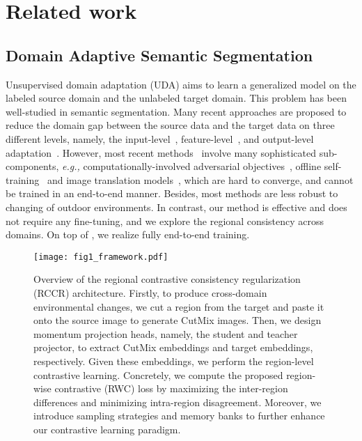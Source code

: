 \documentclass{article}
\begin{document}
  
\section{Related work}


\subsection{Domain Adaptive Semantic Segmentation}

Unsupervised domain adaptation (UDA) aims to learn a generalized model on the labeled source domain and the unlabeled target domain. This problem has been well-studied in semantic segmentation. 
Many recent approaches are proposed to reduce the domain gap between the source data and the target data on three different levels,  namely, the input-level~\cite{BDL,LTIR,LDR}, feature-level~\cite{CBST,CRST}, and output-level adaptation~\cite{AdaptSegNet,SIM,CLANv2}.  
However, most recent methods~\cite{BDL,FDA,SIM,LTIR} involve many sophisticated sub-components, \emph{e.g.,} computationally-involved adversarial objectives~\cite{AdaptSegNet,SIM,CLANv2}, offline self-training~\cite{BDL,DAST,CBST,CRST} and image translation models~\cite{BDL,LTIR,LDR}, which are hard to converge, and cannot be trained in an end-to-end manner. Besides, most methods are  less  robust  to changing of outdoor environments.
In contrast, our method is effective and does not require any fine-tuning, and we explore the regional consistency across domains.  On top of \cite{tranheden2020dacs}, we realize fully end-to-end training.

\begin{figure*}[t]
\centering
\texttt{[image: fig1\_framework.pdf]}
\caption{Overview of the regional contrastive consistency regularization (RCCR) architecture. Firstly, to produce cross-domain environmental changes, we cut a region from the target and paste it onto the source image to generate CutMix images.
Then, we design momentum projection heads, namely, the student and teacher projector, to extract CutMix embeddings and target embeddings, respectively. Given these embeddings, we perform the region-level contrastive learning. Concretely, we compute the proposed region-wise contrastive (RWC) loss  by maximizing  the  inter-region  differences  and  minimizing intra-region disagreement. Moreover, we introduce sampling strategies and memory banks to further enhance our contrastive learning paradigm.
}
\label{fig1}
\end{figure*}
\end{document}
